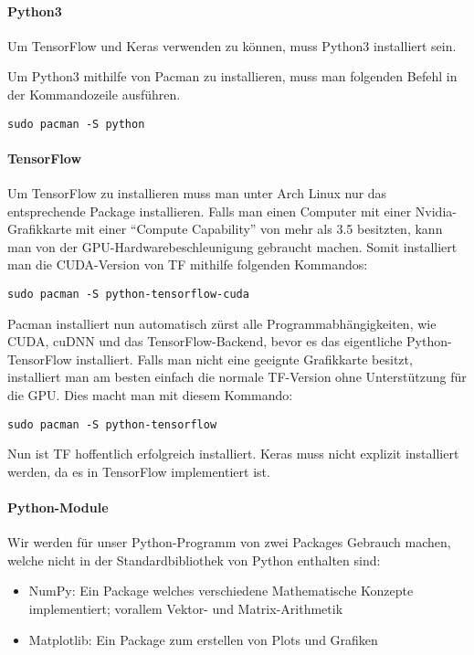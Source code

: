 \paragraph{Python3}
Um TensorFlow und Keras verwenden zu können, muss Python3 installiert sein.

Um Python3 mithilfe von Pacman zu installieren, muss man folgenden Befehl in
der Kommandozeile ausführen.
\begin{verbatim}
sudo pacman -S python
\end{verbatim}

\paragraph{TensorFlow}
Um TensorFlow zu installieren muss man unter Arch Linux nur das entsprechende
Package installieren.
Falls man einen Computer mit einer Nvidia-Grafikkarte mit einer ``Compute
Capability'' von mehr als 3.5 besitzten, kann man von der
GPU-Hardwarebeschleunigung gebraucht machen. Somit installiert man die
CUDA-Version von TF mithilfe folgenden Kommandos:
\begin{verbatim}
sudo pacman -S python-tensorflow-cuda
\end{verbatim}
Pacman installiert nun automatisch zürst alle Programmabhängigkeiten, wie
CUDA, cuDNN und das TensorFlow-Backend, bevor es das eigentliche
Python-TensorFlow installiert.
\para{}
Falls man nicht eine geeignte Grafikkarte besitzt, installiert man am besten
einfach die normale TF-Version ohne Unterstützung für die GPU. Dies macht man
mit diesem Kommando:
\begin{verbatim}
sudo pacman -S python-tensorflow
\end{verbatim}
\para{}
Nun ist TF hoffentlich erfolgreich installiert. Keras muss nicht explizit
installiert werden, da es in TensorFlow implementiert ist.

\paragraph{Python-Module}
Wir werden für unser Python-Programm von zwei Packages Gebrauch machen, welche
nicht in der Standardbibliothek von Python enthalten sind:
\begin{itemize}
\item{NumPy: Ein Package welches verschiedene Mathematische Konzepte
    implementiert; vorallem Vektor- und Matrix-Arithmetik}
\item{Matplotlib: Ein Package zum erstellen von Plots und Grafiken}
\end{itemize}


